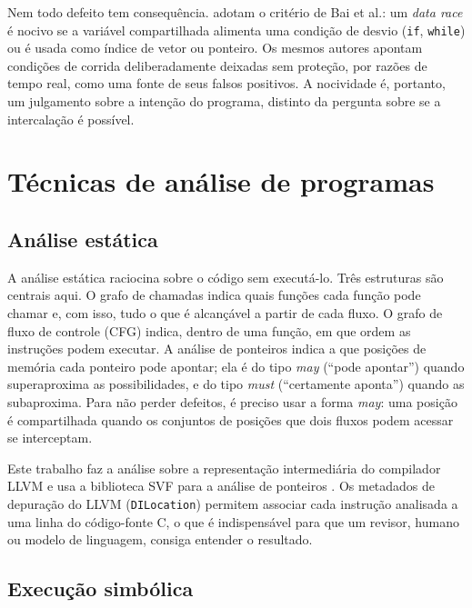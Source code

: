 Nem todo defeito tem consequência.  adotam o critério de
Bai et al.: um \textit{data race} é nocivo se a variável compartilhada alimenta
uma condição de desvio (\texttt{if}, \texttt{while}) ou é usada como índice de
vetor ou ponteiro. Os mesmos autores apontam condições de corrida
deliberadamente deixadas sem proteção, por razões de tempo real, como uma
fonte de seus falsos positivos. A nocividade é, portanto, um julgamento sobre a
intenção do programa, distinto da pergunta sobre se a intercalação é possível.

\section{Técnicas de análise de programas}
\label{sec:tecnicas}


\subsection{Análise estática}

A análise estática raciocina sobre o código sem executá-lo. Três estruturas são
centrais aqui. O grafo de chamadas indica quais funções cada função
pode chamar e, com isso, tudo o que é alcançável a partir de cada fluxo. O
grafo de fluxo de controle (CFG) indica, dentro de uma função, em que
ordem as instruções podem executar. A análise de ponteiros indica a
que posições de memória cada ponteiro pode apontar; ela é do tipo
\textit{may} (``pode apontar'') quando superaproxima as possibilidades, e do
tipo \textit{must} (``certamente aponta'') quando as subaproxima. Para não perder
defeitos, é preciso usar a forma \textit{may}: uma posição é compartilhada
quando os conjuntos de posições que dois fluxos podem acessar se interceptam.

Este trabalho faz a análise sobre a representação intermediária do compilador
LLVM \cite{llvm} e usa a biblioteca SVF para a análise de ponteiros
\cite{svf}. Os metadados de depuração do LLVM (\texttt{DILocation}) permitem
associar cada instrução analisada a uma linha do código-fonte C, o que é
indispensável para que um revisor, humano ou modelo de linguagem, consiga
entender o resultado.

\subsection{Execução simbólica}

